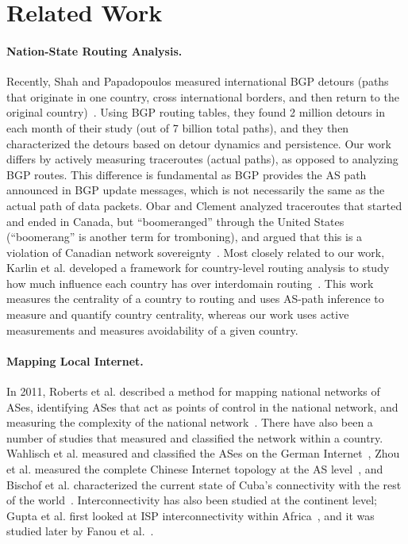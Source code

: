 \section{Related Work}
\label{related}

\paragraph{Nation-State Routing Analysis.}  Recently, Shah and
Papadopoulos measured international BGP detours (paths that originate in
one country, cross international borders, and then return to the
original country)~\cite{shah2015characterizing}.  Using BGP routing
tables, they found 2 million detours in each month of their study (out
of 7 billion total paths), and they then characterized the detours based
on detour dynamics and persistence.  Our work differs by actively
measuring traceroutes (actual paths), as opposed to analyzing BGP
routes.  This difference is fundamental as BGP provides the AS path
announced in BGP update messages, which is not necessarily the same as
the actual path of data packets.  Obar and Clement analyzed traceroutes
that started and ended in Canada, but ``boomeranged'' through the United
States (``boomerang'' is another term for tromboning), and argued that
this is a violation of Canadian network
sovereignty~\cite{obar2012internet}.  Most closely related to our work,
Karlin et al. developed a framework for country-level
routing analysis to study how much influence each country has over
interdomain routing~\cite{karlin2009nation}.  This work measures the
centrality of a country to routing and uses AS-path inference to measure
and quantify country centrality, whereas our work uses active
measurements and measures avoidability of a given country. 

\paragraph{Mapping Local Internet.}  In 2011, Roberts et al. described
a method for mapping national networks of ASes, identifying ASes that
act as points of control in the national network, and measuring the
complexity of the national network~\cite{roberts2011mapping}.  There
have also been a number of studies that measured and classified the
network within a country.  Wahlisch et al. measured and classified the
ASes on the German Internet~\cite{wahlisch2010framework,
  wahlisch2012exposing}, Zhou et al. measured the complete
Chinese Internet topology at the AS level~\cite{zhou2007chinese}, and
Bischof et al. characterized the current state of Cuba's
connectivity with the rest of the world~\cite{bischof2015and}.
Interconnectivity has also been studied at the continent level; Gupta
et al. first looked at ISP interconnectivity within
Africa~\cite{gupta2014peering}, and it was studied later by Fanou et al.~\cite{fanou2015diversity}.


